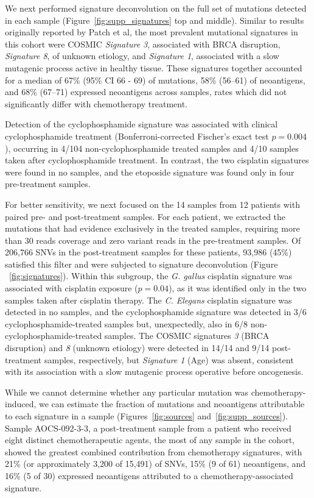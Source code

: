 We next performed signature deconvolution on the full set of mutations detected in each sample (Figure~\ref{fig:supp_signatures} top and middle). Similar to results originally reported by Patch et al, the most prevalent mutational signatures in this cohort were COSMIC \textit{Signature 3}, associated with BRCA disruption, \textit{Signature 8}, of unknown etiology, and \textit{Signature 1}, associated with a slow mutagenic process active in healthy tissue. These signatures together accounted for a median of 67\% (95\% CI 66 - 69) of mutations, 58\% (56--61) of neoantigens, and 68\% (67--71) expressed neoantigens across samples, rates which did not significantly differ with chemotherapy treatment.

Detection of the cyclophosphamide signature was associated with clinical cyclophosphamide treatment (Bonferroni-corrected Fischer's exact test $p = 0.004$), occurring in 4/104 non-cyclophosphamide treated samples and 4/10 samples taken after cyclophosphamide treatment. In contrast, the two cisplatin signatures were found in no samples, and the etoposide signature was found only in four pre-treatment samples.


For better sensitivity, we next focused on the 14 samples from 12 patients with paired pre- and post-treatment samples. For each patient, we extracted the mutations that had evidence exclusively in the treated samples, requiring more than 30 reads coverage and zero variant reads in the pre-treatment samples. Of 206,766 SNVs in the post-treatment samples for these patients, 93,986 (45\%) satisfied this filter and were subjected to signature deconvolution (Figure ~\ref{fig:signatures}). Within this subgroup, the \textit{G. gallus} cisplatin signature was associated with cisplatin exposure ($p = 0.04$), as it was identified only in the two samples taken after cisplatin therapy. The \textit{C. Elegans} cisplatin signature was detected in no samples, and the cyclophosphamide signature was detected in 3/6 cyclophosphamide-treated samples but, unexpectedly, also in 6/8 non-cyclophosphamide-treated samples. The COSMIC signatures \textit{3} (BRCA disruption) and \textit{8} (unknown etiology) were detected in 14/14 and 9/14 post-treatment samples, respectively, but \textit{Signature 1} (Age) was absent, consistent with its association with a slow mutagenic process operative before oncogenesis.

While we cannot determine whether any particular mutation was chemotherapy-induced, we can estimate the fraction of mutations and neoantigens attributable to each signature in a sample (Figures~\ref{fig:sources} and~\ref{fig:supp_sources}). Sample AOCS-092-3-3, a post-treatment sample from a patient who received eight distinct chemotherapeutic agents, the most of any sample in the cohort, showed the greatest combined contribution from chemotherapy signatures, with 21\% (or approximately 3,200 of 15,491) of SNVs, 15\% (9 of 61) neoantigens, and 16\% (5 of 30) expressed neoantigens attributed to a chemotherapy-associated signature.

